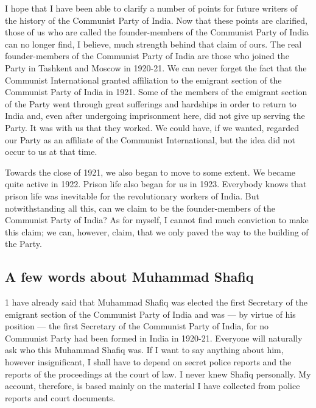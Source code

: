 I hope that I have been able to clarify a number of points for future writers of the history of the Communist Party of India. Now that these points are clarified, those of us who are called the founder-members of the Communist Party of India can no longer find, I believe, much strength behind that claim of ours. The real founder-members of the Communist Party of India are those who joined the Party in Tashkent and Moscow in 1920-21. We can never forget the fact that the Communist International granted affiliation to the emigrant section of the Communist Party of India in 1921. Some of the members of the emigrant section of the Party went through great sufferings and hardships in order to return to India and, even after undergoing imprisonment here, did not give up serving the Party. It was with us that they worked. We could have, if we wanted, regarded our Party as an affiliate of the Communist International, but the idea did not occur to us at that time. 

Towards the close of 1921, we also began to move to some extent. We became quite active in 1922. Prison life also began for us in 1923. Everybody knows that prison life was inevitable for the revolutionary workers of India. But notwithstanding all this, can we claim to be the founder-members of the Communist Party of India? As for myself, I cannot find much conviction
to make this claim; we can, however, claim, that we only paved the way to the building of the Party. 

\subsection{A few words about Muhammad Shafiq} 

1 have already said that Muhammad Shafiq was elected the first Secretary of the emigrant section of the Communist Party of India and was — by virtue of his position — the first Secretary of the Communist Party of India, for no Communist Party had been formed in India in 1920-21. Everyone will naturally ask who this Muhammad Shafiq was. If I want to say anything about him, however insignificant, I shall have to depend on secret police reports and the reports of the proceedings at the court of law. I never knew Shafiq personally. My account, therefore, is based mainly on the material I have collected from police reports and court documents. 

